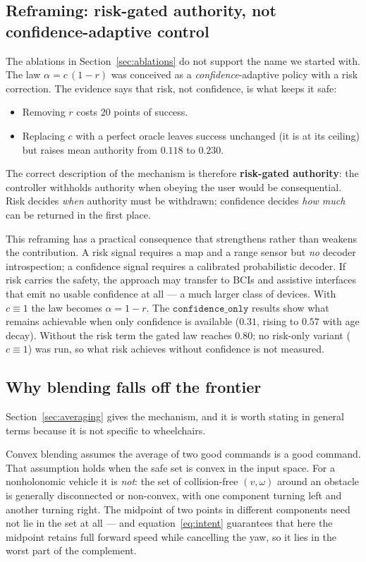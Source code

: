\documentclass[11pt,a4paper]{article}
\newcommand{\vconf}{\texttt{confidence\_only}}
\theoremstyle{plain}
\theoremstyle{definition}
\begin{document}
\subsection{Reframing: risk-gated authority, not confidence-adaptive control}
\label{sec:reframe}

The ablations in Section~\ref{sec:ablations} do not support the name we
started with. The law $\alpha = c\,(1-r)$ was conceived as a
\emph{confidence}-adaptive policy with a risk correction. The evidence
says that risk, not confidence, is what keeps it safe:

\begin{itemize}
\item Removing $r$ costs $20$ points of success.
\item Replacing $c$ with a perfect oracle leaves success unchanged (it
      is at its ceiling) but raises mean authority from $0.118$ to
      $0.230$.
\end{itemize}

The correct description of the mechanism is therefore \textbf{risk-gated
authority}: the controller withholds authority when obeying the user
would be consequential. Risk decides \emph{when} authority must be
withdrawn; confidence decides \emph{how much} can be returned in the
first place.

This reframing has a practical consequence that strengthens rather than
weakens the contribution. A risk signal requires a map and a range
sensor but \emph{no} decoder introspection; a confidence signal requires
a calibrated probabilistic decoder. If risk carries the safety, the approach
may transfer to BCIs and assistive interfaces that emit no usable
confidence at all --- a much larger class of devices. With $c \equiv 1$
the law becomes $\alpha = 1 - r$. The
$\vconf{}$ results show what remains achievable when only confidence is
available ($0.31$, rising to $0.57$ with age decay). Without the risk
term the gated law reaches $0.80$; no risk-only variant ($c \equiv 1$)
was run, so what risk achieves without confidence is not measured.

\subsection{Why blending falls off the frontier}

Section~\ref{sec:averaging} gives the mechanism, and it is worth stating
in general terms because it is not specific to wheelchairs.

Convex blending assumes the average of two good commands is a good
command. That assumption holds when the safe set is convex in the input
space. For a nonholonomic vehicle it is \emph{not}: the set of
collision-free $(v, \omega)$ around an obstacle is generally disconnected
or non-convex, with one component turning left and another turning
right. The midpoint of two points in different components need not lie
in the set at all --- and equation~\eqref{eq:intent} guarantees that
here the midpoint retains full forward speed while cancelling the yaw,
so it lies in the worst part of the complement.
\end{document}
